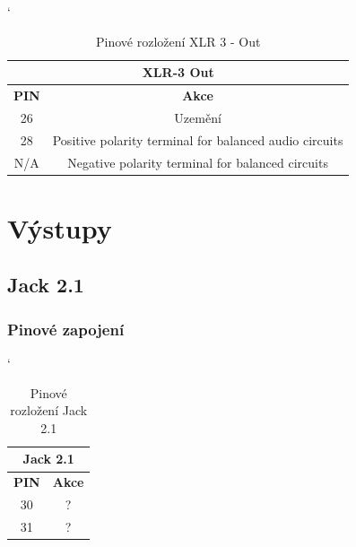 \begin{table} [h!]
	\centering
	\catcode`
	\begin{tabular}[c]{|| c | c ||}
	\hline
		\multicolumn{2}{||c||}{XLR-3 Out} \\
	\hline
 		 \textbf{PIN} & \textbf{Akce}\\
	\hline
		26 &  Uzemění\\
	\hline
		28 & Positive polarity terminal for balanced audio circuits \\
	\hline
		N/A & Negative polarity terminal for balanced circuits \\
	\hline
	\end{tabular}
	\caption{Pinové rozložení XLR 3 - Out}
	\label{table:pinXLR-OUT}
\end{table}

\section{Výstupy}
\subsection{Jack 2.1}
\subsubsection*{Pinové zapojení}
\begin{table} [h!]
	\centering
	\catcode`
	\begin{tabular}[c]{|| c | c ||}
	\hline
		\multicolumn{2}{||c||}{Jack 2.1} \\
	\hline
 		 \textbf{PIN} & \textbf{Akce}\\
	\hline
		30 &  ?\\
	\hline
		31 & ? \\
	\hline
	\end{tabular}
	\caption{Pinové rozložení Jack 2.1}
	\label{table:pinJack21}
\end{table}